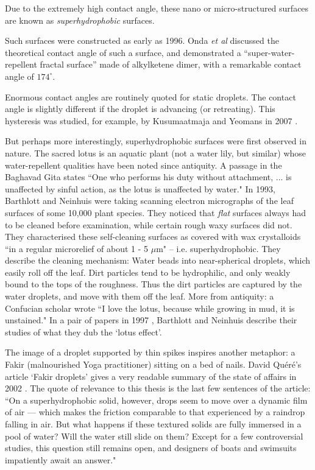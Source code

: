 \documentclass[a4paper]{report}
\begin{document}
Due to the extremely high contact angle, these nano or micro-structured surfaces are known as \emph{superhydrophobic} surfaces.


\vspace*{1em}
Such surfaces were constructed as early as 1996.  Onda \emph{et al} \cite{Onda1996} discussed the theoretical contact angle of such a surface, and demonstrated a ``super-water-repellent fractal surface'' made of alkylketene dimer, with a remarkable contact angle of $174^{\circ}$.

Enormous contact angles are routinely quoted for static droplets.  The contact angle is slightly different if the droplet is advancing (or retreating).  This hysteresis was studied, for example, by Kusumaatmaja and Yeomans in 2007 \cite{KusumaatmajaYeomans2007}.

But perhaps more interestingly, superhydrophobic surfaces were first observed in nature. The sacred lotus is an aquatic plant (not a water lily, but similar) whose water-repellent qualities have been noted since antiquity.  A passage in the Baghavad Gita states ``One who performs his duty without attachment, ... is unaffected by sinful action, as the lotus is unaffected by water."
In 1993, Barthlott and Neinhuis were taking scanning electron micrographs of the leaf surfaces of some 10,000 plant species.  They noticed that \emph{flat} surfaces always had to be cleaned before examination, while certain rough waxy surfaces did not.  They characterised these self-cleaning surfaces as covered with wax crystalloids ``in a regular microrelief of about 1 - 5 $\mu$m" -- i.e. superhydrophobic.  They describe the cleaning mechanism: Water beads into near-spherical droplets, which easily roll off the leaf.  Dirt particles tend to be hydrophilic, and only weakly bound to the tops of the roughness.  Thus the dirt particles are captured by the water droplets, and move with them off the leaf.  More from antiquity: a Confucian scholar wrote ``I love the lotus, because while growing in mud, it is unstained." In a pair of papers in 1997 \cite{BarthlottNeinhuis1997,NeinhuisBarthlott1997}, Barthlott and Neinhuis describe their studies of what they dub the `lotus effect'.

The image of a droplet supported by thin spikes inspires another metaphor: a Fakir (malnourished Yoga practitioner) sitting on a bed of nails.  David Qu\'{e}r\'{e}'s article `Fakir droplets' gives a very readable summary of the state of affairs in 2002 \cite{Quere2002}.  The quote of relevance to this thesis is the last few sentences of the article: ``On a superhydrophobic solid, however, drops seem to move over a dynamic film of air --- which makes the friction comparable to that experienced by a raindrop falling in air.  But what happens if these textured solids are fully immersed in a pool of water? Will the water still slide on them?  Except for a few controversial studies, this question still remains open, and designers of boats and swimsuits impatiently await an answer."
\end{document}

